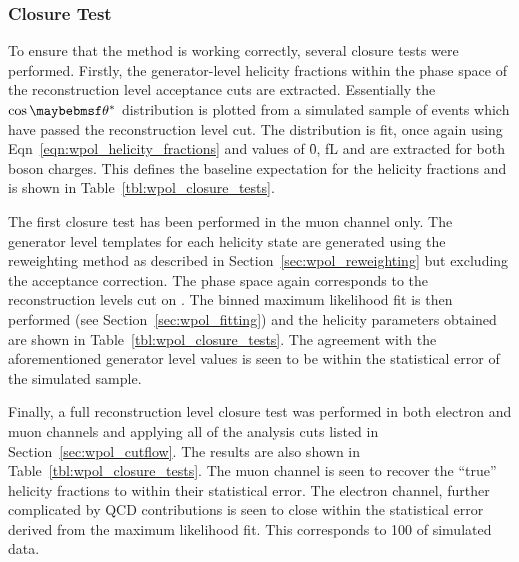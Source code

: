 \begin{figure}
\centering
{}\quad
{}\quad
\caption{}
\label{fig:wpol_genreco}
\end{figure}

\subsubsection{Closure Test}
To ensure that the method is working correctly, several closure tests were
performed. Firstly, the generator-level helicity fractions within the phase
space of the reconstruction level \PW acceptance cuts are extracted. Essentially
the $\cos\thetastar$ distribution is plotted from a simulated sample of events
which have passed the reconstruction level \PtW cut. The distribution is fit,
once again using Eqn~\ref{eqn:wpol_helicity_fractions} and values of \f0, fL and
\fR are extracted for both boson charges. This defines the baseline expectation
for the helicity fractions and is shown in Table~\ref{tbl:wpol_closure_tests}.

The first closure test has been performed in the muon channel only. The
generator level \LP templates for each helicity state are generated using the
reweighting method as described in Section~\ref{sec:wpol_reweighting} but excluding
the acceptance correction. The phase space again corresponds to the
reconstruction levels cut on \PtW. The binned maximum likelihood fit is then
performed (see Section~\ref{sec:wpol_fitting}) and the helicity parameters
obtained are shown in Table~\ref{tbl:wpol_closure_tests}. The agreement with the
aforementioned generator level values is seen to be within the statistical error
of the simulated sample.

Finally, a full reconstruction level closure test was performed in both electron
and muon channels and applying all of the analysis cuts listed in
Section~\ref{sec:wpol_cutflow}. The results are also shown in
Table~\ref{tbl:wpol_closure_tests}. The muon channel is seen to recover the
``true'' helicity fractions to within their statistical error. The electron
channel, further complicated by \ac{QCD} contributions is seen to close within
the statistical error derived from the maximum likelihood fit. This corresponds
to \unit{100}{\invpicobarn} of simulated data.

